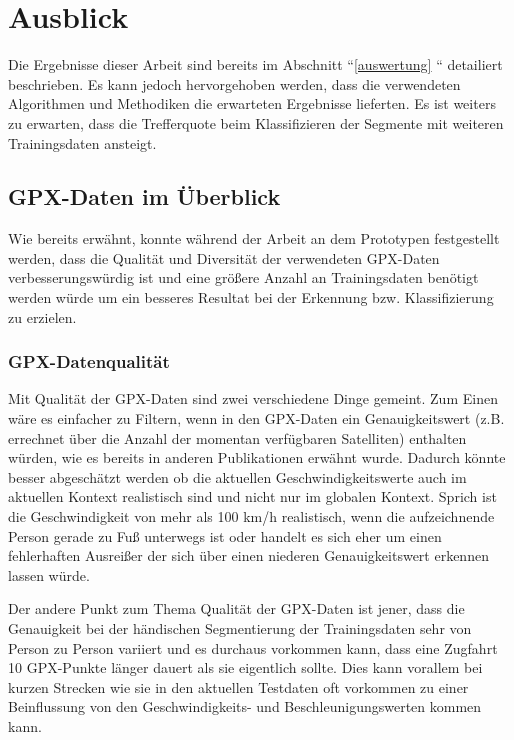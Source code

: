 \chapter{Ausblick}
Die Ergebnisse dieser Arbeit sind bereits im Abschnitt ``\ref{auswertung} `` detailiert beschrieben. Es kann jedoch hervorgehoben werden, dass die verwendeten Algorithmen und Methodiken die erwarteten Ergebnisse lieferten. Es ist weiters zu erwarten, dass die Trefferquote beim Klassifizieren der Segmente mit weiteren Trainingsdaten ansteigt. 

\section{GPX-Daten im Überblick}
Wie bereits erwähnt, konnte während der Arbeit an dem Prototypen festgestellt werden, dass die Qualität und Diversität der verwendeten GPX-Daten verbesserungswürdig ist und eine größere Anzahl an Trainingsdaten benötigt werden würde um ein besseres Resultat bei der Erkennung bzw. Klassifizierung zu erzielen. 

\subsection{GPX-Datenqualität}
Mit Qualität der GPX-Daten sind zwei verschiedene Dinge gemeint. Zum Einen wäre es einfacher zu Filtern, wenn in den GPX-Daten ein Genauigkeitswert (z.B. errechnet über die Anzahl der momentan verfügbaren Satelliten) enthalten würden, wie es bereits in anderen Publikationen erwähnt wurde. Dadurch könnte besser abgeschätzt werden ob die aktuellen Geschwindigkeitswerte auch im aktuellen Kontext realistisch sind und nicht nur im globalen Kontext. Sprich ist die Geschwindigkeit von mehr als 100 km/h realistisch, wenn die aufzeichnende Person gerade zu Fuß unterwegs ist oder handelt es sich eher um einen fehlerhaften Ausreißer der sich über einen niederen Genauigkeitswert erkennen lassen würde. 

Der andere Punkt zum Thema Qualität der GPX-Daten ist jener, dass die Genauigkeit bei der händischen Segmentierung der Trainingsdaten sehr von Person zu Person variiert und es durchaus vorkommen kann, dass eine Zugfahrt 10 GPX-Punkte länger dauert als sie eigentlich sollte. Dies kann vorallem bei kurzen Strecken wie sie in den aktuellen Testdaten oft vorkommen zu einer Beinflussung von den Geschwindigkeits- und Beschleunigungswerten kommen kann. 

